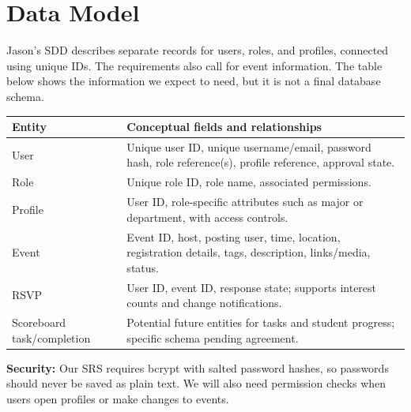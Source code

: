\documentclass[11pt,letterpaper]{article}
\begin{document}
\section{Data Model}
Jason's SDD describes separate records for users, roles, and profiles, connected using unique IDs. The requirements also call for event information. The table below shows the information we expect to need, but it is not a final database schema.
\begin{longtable}{p{}p{}}
\toprule Entity & Conceptual fields and relationships \\ \midrule
User & Unique user ID, unique username/email, password hash, role reference(s), profile reference, approval state.\\
Role & Unique role ID, role name, associated permissions.\\
Profile & User ID, role-specific attributes such as major or department, with access controls.\\
Event & Event ID, host, posting user, time, location, registration details, tags, description, links/media, status.\\
RSVP & User ID, event ID, response state; supports interest counts and change notifications.\\
Scoreboard task/completion & Potential future entities for tasks and student progress; specific schema pending agreement.\\
\bottomrule
\end{longtable}
\noindent\textbf{Security:} Our SRS requires bcrypt with salted password hashes, so passwords should never be saved as plain text. We will also need permission checks when users open profiles or make changes to events.
\end{document}
